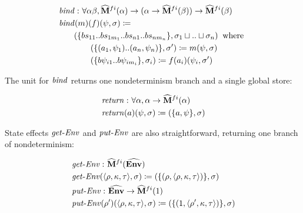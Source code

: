 \small\begin{align*}
&\hspace{0em}  \operatorname{\mathit{bind}}   \mathbin{\colon}   \forall   \alpha   \beta ,  \widehat{\mathtt{\mathbf{M}}} ^{  fi } ( \alpha )  \rightarrow  ( \alpha   \rightarrow   \widehat{\mathtt{\mathbf{M}}} ^{  fi } ( \beta ))  \rightarrow   \widehat{\mathtt{\mathbf{M}}} ^{  fi } ( \beta ) \\
&\hspace{0em}  \operatorname{\mathit{bind}}( m)(f)( \psi , \sigma )  \coloneqq   \\
&\hspace{2em} ( \{ bs _{ 11 }  .. bs _{ 1m _1  }  .. bs _{ n1 }  .. bs _{ nm _n  }  \} , \sigma  _1   \sqcup  ..  \sqcup   \sigma  _n )  \;\;\text{where}\;\;  \\
&\hspace{4em} ( \{ (a _1 , \psi  _1 ) .. (a _n , \psi  _n ) \} , \sigma ')  \coloneqq  m( \psi , \sigma ) \\
&\hspace{4em} ( \{ b \psi  _{ i1 }  .. b \psi  _{ im _i  }  \} , \sigma  _i )  \coloneqq  f(a _i )( \psi  _i , \sigma ')
\end{align*}\normalsize

The unit for $ \operatorname{\mathit{bind}} $ returns one nondeterminism branch and a
single global store:

\small\begin{align*}
&\hspace{0em}  \operatorname{\mathit{return}}   \mathbin{\colon}   \forall   \alpha ,  \alpha   \rightarrow   \widehat{\mathtt{\mathbf{M}}} ^{  fi } ( \alpha ) \\
&\hspace{0em}  \operatorname{\mathit{return}}( a)( \psi , \sigma )  \coloneqq  ( \{ a, \psi  \} , \sigma )
\end{align*}\normalsize

\par

State effects $ \operatorname{\mathit{get-Env}} $ and $ \operatorname{\mathit{put-Env}} $ are also
straightforward, returning one branch of nondeterminism:

\small\begin{align*}
&\hspace{0em}  \operatorname{\mathit{get-Env}}   \mathbin{\colon}   \widehat{\mathtt{\mathbf{M}}} ^{  fi }  (\widehat{\mathtt{\mathbf{Env}}})  \\
&\hspace{0em}  \operatorname{\mathit{get-Env}}(  \langle  \rho , \kappa , \tau  \rangle , \sigma )  \coloneqq  ( \{ ( \rho , \langle  \rho , \kappa , \tau  \rangle ) \} , \sigma ) \\
&\hspace{0em}  \operatorname{\mathit{put-Env}}   \mathbin{\colon}   \widehat{\mathtt{\mathbf{Env}}}   \rightarrow   \widehat{\mathtt{\mathbf{M}}} ^{  fi } (1) \\
&\hspace{0em}  \operatorname{\mathit{put-Env}}(  \rho ')( \langle  \rho , \kappa , \tau  \rangle , \sigma )  \coloneqq  ( \{ (1, \langle  \rho ', \kappa , \tau  \rangle ) \} , \sigma )
\end{align*}\normalsize

